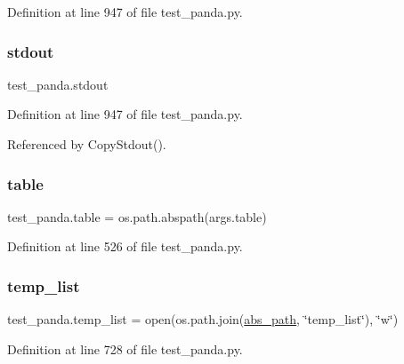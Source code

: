 Definition at line 947 of file test\+\_\+panda.\+py.

\mbox{\label{namespacetest__panda_ab9a316faa297fa3703606c6de25a15cc}} 
\subsubsection{\texorpdfstring{stdout}{stdout}}
{\footnotesize\ttfamily test\+\_\+panda.\+stdout}



Definition at line 947 of file test\+\_\+panda.\+py.



Referenced by Copy\+Stdout().

\mbox{\label{namespacetest__panda_a73f08524774fa123c28bae298d21f00b}} 
\subsubsection{\texorpdfstring{table}{table}}
{\footnotesize\ttfamily test\+\_\+panda.\+table = os.\+path.\+abspath(args.\+table)}



Definition at line 526 of file test\+\_\+panda.\+py.

\mbox{\label{namespacetest__panda_ac11fc08b9c4f7bf3f1d47d8ba9399feb}} 
\subsubsection{\texorpdfstring{temp\+\_\+list}{temp\_list}}
{\footnotesize\ttfamily test\+\_\+panda.\+temp\+\_\+list = open(os.\+path.\+join(\hyperlink{namespacetest__panda_a78bb23566d04ac65a03195681449d2c0}{abs\+\_\+path}, \char`\"{}temp\+\_\+list\char`\"{}), \char`\"{}w\char`\"{})}



Definition at line 728 of file test\+\_\+panda.\+py.

\mbox{\label{namespacetest__panda_ae3dc7b036d69d4a16c0a5d932667b884}} 
